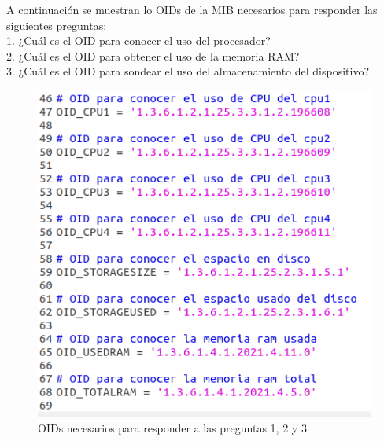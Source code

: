 A continuación se muestran lo OIDs de la MIB necesarios para responder las siguientes preguntas:\\

1. ¿Cuál es el OID para conocer el uso del procesador?\\
2. ¿Cuál es el OID para obtener el uso de la memoria RAM?\\ 
3. ¿Cuál es el OID para sondear el uso del almacenamiento del dispositivo?\\
\pagebreak
\begin{figure}[!htpb]
	\hypertarget{fig:oids}{\hspace{1pt}}
	\begin{center}
		\includegraphics{imagenes/oids.png}
		\caption{OIDs necesarios para responder a las preguntas 1, 2 y 3}
		\label{fig:oids}
	\end{center}
\end{figure}